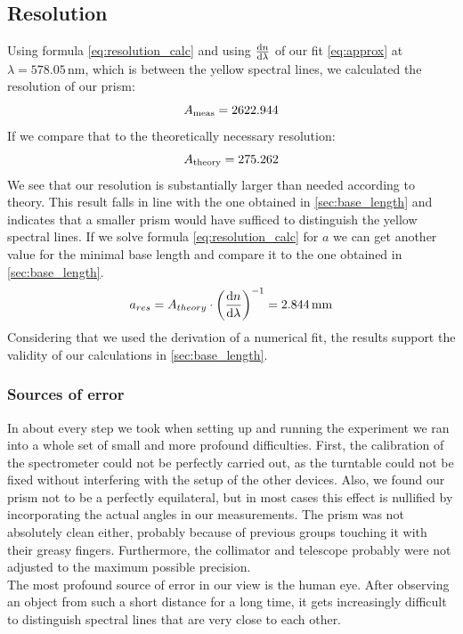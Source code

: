 \documentclass{scrreprt}
\newcommand{\unit}[1]{\ensuremath{\, \mathrm{#1}}}
\begin{document}
\subsection{Resolution}
Using formula \ref{eq:resolution_calc} and using $\frac{\dif{n}}{\dif{\lambda}}$ of our fit \ref{eq:approx} at $\lambda = 578.05 \unit{nm}$, which is between the yellow spectral lines, we calculated the resolution of our prism:
\begin{equation}
	A_{\text{meas}} = 2622.944
	\notag
\end{equation}
If we compare that to the theoretically necessary resolution:
\begin{equation}
	A_{\text{theory}} = 275.262
	\notag
\end{equation}
We see that our resolution is substantially larger than needed according to theory. This result falls in line with the one obtained in \ref{sec:base_length} and indicates that a smaller prism would have sufficed to distinguish the yellow spectral lines. If we solve formula \ref{eq:resolution_calc} for $a$ we can get another value for the minimal base length and compare it to the one obtained in \ref{sec:base_length}.
\begin{equation}
	a_{res} = A_{theory} \cdot \left(\frac{\dif{n}}{\dif{\lambda}}\right)^{-1} = 2.844 \unit{mm}
\notag
\end{equation}
Considering that we used the derivation of a numerical fit, the results support the validity of our calculations in \ref{sec:base_length}.

\subsubsection{Sources of error}
In about every step we took when setting up and running the experiment we ran into a whole set of small and more profound difficulties. First, the calibration of the spectrometer could not be perfectly carried out, as the turntable could not be fixed without interfering with the setup of the other devices. Also, we found our prism not to be a perfectly equilateral, but in most cases this effect is nullified by incorporating the actual angles in our measurements. The prism was not absolutely clean either, probably because of previous groups touching it with their greasy fingers.
Furthermore, the collimator and telescope probably were not adjusted to the maximum possible precision.\\
The most profound source of error in our view is the human eye. After observing an object from such a short distance for a long time, it gets increasingly difficult to distinguish spectral lines that are very close to each other. 
\end{document}
